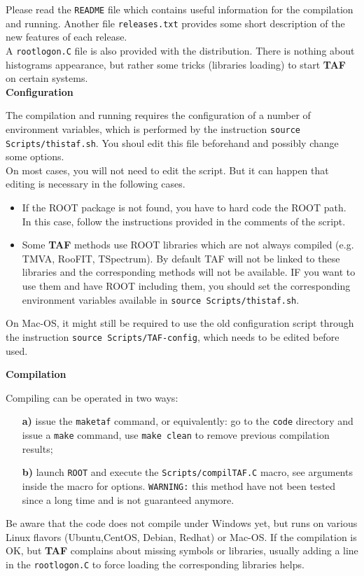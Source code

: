 \documentclass[a4paper, 12pt, twoside]{article}
\newif\ifwithcomment
\newcommand{\comment}[1]{\ifwithcomment {\textcolor{blue}{\it#1}} \fi}
\newcommand{\TAF}{{\bf TAF }}
\begin{document}
\noindent
Please read the {\tt README} file which contains useful information for the compilation and running. Another file {\tt releases.txt} provides some short description of the new features of each release.\\
A {\tt rootlogon.C} file is also provided with the distribution. There is nothing about histograms appearance, but rather some tricks (libraries loading) to start \TAF on certain systems.\\

\noindent
{\bf Configuration}

\noindent
The compilation and running requires the configuration of a number of environment variables, which is performed by the instruction {\tt source Scripts/thistaf.sh}. You shoul edit this file beforehand and possibly change some options.\\
On most cases, you will not need to edit the script. But it can happen that editing is necessary in the following cases.
\begin{itemize}
\item If the ROOT package is not found, you have to hard code the ROOT path. In this case, follow the instructions provided in the comments of the script. 
\item Some \TAF methods use ROOT libraries which are not always compiled (e.g. TMVA, RooFIT, TSpectrum). By default TAF will not be linked to these libraries and the corresponding methods will not be available. IF you want to use them and have ROOT including them, you should set the corresponding environment variables  available in {\tt source Scripts/thistaf.sh}.
\end{itemize}
On Mac-OS, it might still be required to use the old configuration script through the instruction {\tt source Scripts/TAF-config}, which needs to be edited before used.\\

\noindent
\comment{Preprocessor instructions have to be listed, {\tt Windows/LINUX, ROOT, ROOFIT, Minuit2...}.}

\noindent
{\bf Compilation}

\noindent
Compiling can be operated in two ways:
\begin{itemize}
\item[{\bf a)}] issue the {\tt maketaf} command, or equivalently: go to the {\tt code} directory and issue a {\tt make} command, use {\tt make clean} to remove previous compilation results;
\item[{\bf b)}] launch {\tt ROOT} and execute the {\tt Scripts/compilTAF.C} macro, see arguments inside the macro for options. {\tt WARNING:} this method have not been tested since a long time and is not guaranteed anymore.
\end{itemize}
Be aware that the code does not compile under Windows yet, but runs on various Linux flavors (Ubuntu,CentOS, Debian, Redhat) or Mac-OS. If the compilation is OK, but \TAF complains about missing symbols or libraries, usually adding a line in the {\tt rootlogon.C} to force loading the corresponding libraries helps.
\end{document}
